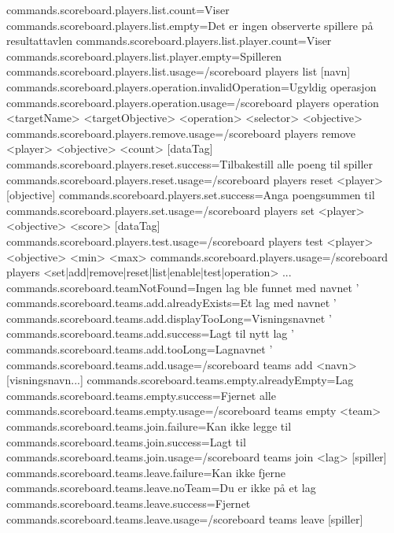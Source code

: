 commands.scoreboard.players.list.count=Viser %
commands.scoreboard.players.list.empty=Det er ingen observerte spillere på resultattavlen
commands.scoreboard.players.list.player.count=Viser %
commands.scoreboard.players.list.player.empty=Spilleren %
commands.scoreboard.players.list.usage=/scoreboard players list [navn]
commands.scoreboard.players.operation.invalidOperation=Ugyldig operasjon %
commands.scoreboard.players.operation.usage=/scoreboard players operation <targetName> <targetObjective> <operation> <selector> <objective>
commands.scoreboard.players.remove.usage=/scoreboard players remove <player> <objective> <count> [dataTag]
commands.scoreboard.players.reset.success=Tilbakestill alle poeng til spiller %
commands.scoreboard.players.reset.usage=/scoreboard players reset <player> [objective]
commands.scoreboard.players.set.success=Anga poengsummen til %
commands.scoreboard.players.set.usage=/scoreboard players set <player> <objective> <score> [dataTag]
commands.scoreboard.players.test.usage=/scoreboard players test <player> <objective> <min> <max>
commands.scoreboard.players.usage=/scoreboard players <set|add|remove|reset|list|enable|test|operation> ...
commands.scoreboard.teamNotFound=Ingen lag ble funnet med navnet '%
commands.scoreboard.teams.add.alreadyExists=Et lag med navnet '%
commands.scoreboard.teams.add.displayTooLong=Visningsnavnet '%
commands.scoreboard.teams.add.success=Lagt til nytt lag '%
commands.scoreboard.teams.add.tooLong=Lagnavnet '%
commands.scoreboard.teams.add.usage=/scoreboard teams add <navn> [visningsnavn...]
commands.scoreboard.teams.empty.alreadyEmpty=Lag %
commands.scoreboard.teams.empty.success=Fjernet alle %
commands.scoreboard.teams.empty.usage=/scoreboard teams empty <team>
commands.scoreboard.teams.join.failure=Kan ikke legge til %
commands.scoreboard.teams.join.success=Lagt til %
commands.scoreboard.teams.join.usage=/scoreboard teams join <lag> [spiller]
commands.scoreboard.teams.leave.failure=Kan ikke fjerne %
commands.scoreboard.teams.leave.noTeam=Du er ikke på et lag
commands.scoreboard.teams.leave.success=Fjernet %
commands.scoreboard.teams.leave.usage=/scoreboard teams leave [spiller]
